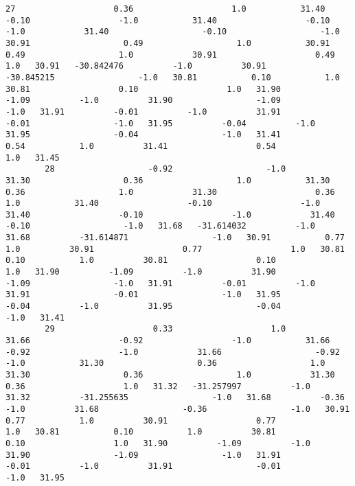 \documentclass[11pt]{article}
\begin{document}
\begin{Verbatim}[commandchars=\\\{\}]
        27                    0.36                    1.0           31.40                  -0.10                  -1.0           31.40                  -0.10                  -1.0            31.40                   -0.10                   -1.0           30.91                   0.49                   1.0           30.91                   0.49                   1.0            30.91                    0.49                    1.0   30.91   -30.842476          -1.0          30.91          -30.845215                 -1.0   30.81           0.10           1.0          30.81                  0.10                  1.0   31.90          -1.09          -1.0          31.90                 -1.09                 -1.0   31.91          -0.01          -1.0          31.91                 -0.01                 -1.0   31.95          -0.04          -1.0          31.95                 -0.04                 -1.0   31.41           0.54           1.0          31.41                  0.54                  1.0   31.45   
        28                   -0.92                   -1.0           31.30                   0.36                   1.0           31.30                   0.36                   1.0            31.30                    0.36                    1.0           31.40                  -0.10                  -1.0           31.40                  -0.10                  -1.0            31.40                   -0.10                   -1.0   31.68   -31.614032          -1.0          31.68          -31.614871                 -1.0   30.91           0.77           1.0          30.91                  0.77                  1.0   30.81           0.10           1.0          30.81                  0.10                  1.0   31.90          -1.09          -1.0          31.90                 -1.09                 -1.0   31.91          -0.01          -1.0          31.91                 -0.01                 -1.0   31.95          -0.04          -1.0          31.95                 -0.04                 -1.0   31.41   
        29                    0.33                    1.0           31.66                  -0.92                  -1.0           31.66                  -0.92                  -1.0            31.66                   -0.92                   -1.0           31.30                   0.36                   1.0           31.30                   0.36                   1.0            31.30                    0.36                    1.0   31.32   -31.257997          -1.0          31.32          -31.255635                 -1.0   31.68          -0.36          -1.0          31.68                 -0.36                 -1.0   30.91           0.77           1.0          30.91                  0.77                  1.0   30.81           0.10           1.0          30.81                  0.10                  1.0   31.90          -1.09          -1.0          31.90                 -1.09                 -1.0   31.91          -0.01          -1.0          31.91                 -0.01                 -1.0   31.95   

\end{Verbatim}
\end{document}
